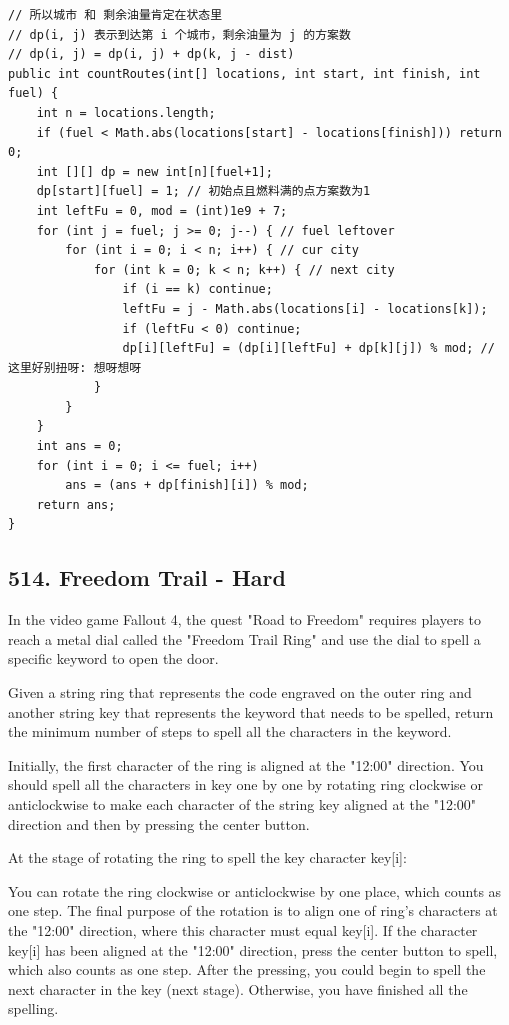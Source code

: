 \documentclass[9pt, b5paper]{article}
\begin{document}
\begin{verbatim}
// 所以城市 和 剩余油量肯定在状态里
// dp(i, j) 表示到达第 i 个城市，剩余油量为 j 的方案数
// dp(i, j) = dp(i, j) + dp(k, j - dist)
public int countRoutes(int[] locations, int start, int finish, int fuel) {
    int n = locations.length;
    if (fuel < Math.abs(locations[start] - locations[finish])) return 0;
    int [][] dp = new int[n][fuel+1];
    dp[start][fuel] = 1; // 初始点且燃料满的点方案数为1
    int leftFu = 0, mod = (int)1e9 + 7;
    for (int j = fuel; j >= 0; j--) { // fuel leftover
        for (int i = 0; i < n; i++) { // cur city
            for (int k = 0; k < n; k++) { // next city
                if (i == k) continue;
                leftFu = j - Math.abs(locations[i] - locations[k]);
                if (leftFu < 0) continue;
                dp[i][leftFu] = (dp[i][leftFu] + dp[k][j]) % mod; // 这里好别扭呀: 想呀想呀 
            }
        }
    }
    int ans = 0;
    for (int i = 0; i <= fuel; i++) 
        ans = (ans + dp[finish][i]) % mod;
    return ans;
}
\end{verbatim}

\subsection{514. Freedom Trail - Hard}
\label{sec-4-3}
In the video game Fallout 4, the quest "Road to Freedom" requires players to reach a metal dial called the "Freedom Trail Ring" and use the dial to spell a specific keyword to open the door.

Given a string ring that represents the code engraved on the outer ring and another string key that represents the keyword that needs to be spelled, return the minimum number of steps to spell all the characters in the keyword.

Initially, the first character of the ring is aligned at the "12:00" direction. You should spell all the characters in key one by one by rotating ring clockwise or anticlockwise to make each character of the string key aligned at the "12:00" direction and then by pressing the center button.

At the stage of rotating the ring to spell the key character key[i]:

You can rotate the ring clockwise or anticlockwise by one place, which counts as one step. The final purpose of the rotation is to align one of ring's characters at the "12:00" direction, where this character must equal key[i].
If the character key[i] has been aligned at the "12:00" direction, press the center button to spell, which also counts as one step. After the pressing, you could begin to spell the next character in the key (next stage). Otherwise, you have finished all the spelling.
\end{document}
